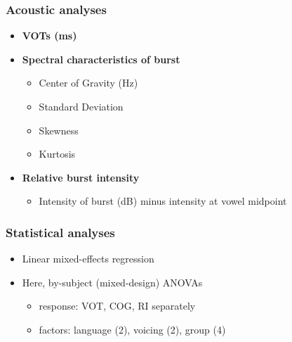 \documentclass{beamer}
\begin{document}
\begin{frame}
\frametitle{Acoustic analyses}
\begin{itemize}
	\item \textbf{\alert{VOTs (ms)}}
	\item \textbf{\alert{Spectral characteristics of burst}}
	\begin{itemize}
		\item \alert{Center of Gravity (Hz)}
		\item Standard Deviation
		\item Skewness
		\item Kurtosis
	\end{itemize}
	\item \textbf{\alert{Relative burst intensity}}
	\begin{itemize}
		\item Intensity of burst (dB) minus intensity at vowel midpoint
	\end{itemize}
\end{itemize}
\end{frame}

\begin{frame}
\frametitle{Statistical analyses}
\begin{itemize}
	\item Linear mixed-effects regression
	\item Here, by-subject (mixed-design) ANOVAs
	\begin{itemize}
		\item response: VOT, COG, RI separately
		\item factors: language (2), voicing (2), group (4)
	\end{itemize}
\end{itemize}
\end{frame}
\end{document}
